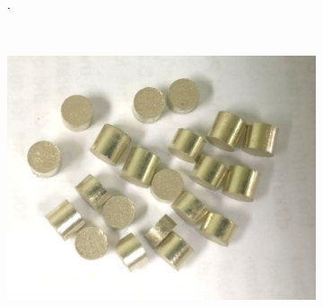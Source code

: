 \documentclass[a4paper,12pt,fleqn,twoside,openany]{book}
\begin{document}
\begin{figure}[h]
\begin{subfigure}{0.2\textwidth}
	\caption{}. 
	\label{fig:PastViruta}
    \end{subfigure}
    ~ %
    \begin{subfigure}{0.25\textwidth}
        \includegraphics[width=\textwidth]{Img/Procedimiento/PastMolienda.jpg}
        \caption{}
        \label{fig:PastMolienda}
    \end{subfigure}
    \begin{subfigure}{0.1\textwidth}

\end{subfigure}
\end{figure}
\end{document}
